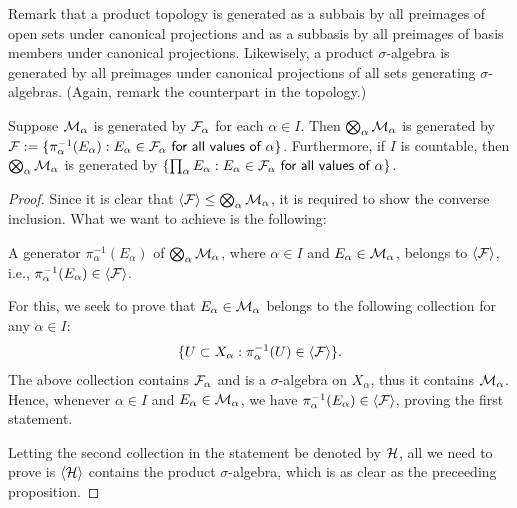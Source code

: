 Remark that a product topology is generated as a subbais by all preimages of open sets under canonical projections and as a subbasis by all preimages of basis members under canonical projections.
Likewisely, a product $\sigma$-algebra is generated by all preimages under canonical projections of all sets generating $\sigma$-algebras.
(Again, remark the counterpart in the topology.)
\begin{prop}
    Suppose ${\mathcal{M}}_\alpha$ is generated by ${\mathcal{F}}_\alpha$ for each $\alpha\in I$.
    Then $\bigotimes_\alpha{\mathcal{M}}_\alpha$ is generated by ${\mathcal{F}}:=\{\pi_\alpha^{-1}(E_\alpha):\textsf{$E_\alpha\in{\mathcal{F}}_\alpha$ for all values of $\alpha$}\}$.
    Furthermore, if $I$ is countable, then $\bigotimes_\alpha{\mathcal{M}}_\alpha$ is generated by $\{\prod_\alpha E_\alpha:\textsf{$E_\alpha\in{\mathcal{F}}_\alpha$ for all values of $\alpha$}\}$.
\end{prop}
\begin{proof}
    Since it is clear that ${\left\langle{{\mathcal{F}}}\right\rangle}\leq\bigotimes_\alpha{\mathcal{M}}_\alpha$, it is required to show the converse inclusion.
    What we want to achieve is the following:
    \begin{center}
        A generator $\pi_\alpha^{-1}(E_\alpha)$ of $\bigotimes_\alpha{\mathcal{M}}_\alpha$, where $\alpha\in I$ and $E_\alpha\in{\mathcal{M}}_\alpha$, belongs to ${\left\langle{{\mathcal{F}}}\right\rangle}$, i.e., $\pi_\alpha^{-1}(E_\alpha)\in{\left\langle{{\mathcal{F}}}\right\rangle}$.
    \end{center}
    For this, we seek to prove that $E_\alpha\in{\mathcal{M}}_\alpha$ belongs to the following collection for any $\alpha\in I$:
    \begin{align}\label{strategy for non-constructive objects}
        \{U\subset X_\alpha
        :
        \pi_\alpha^{-1}(U)\in{\left\langle{{\mathcal{F}}}\right\rangle}
        \}.
    \end{align}
    The above collection contains ${\mathcal{F}}_\alpha$ and is a $\sigma$-algebra on $X_\alpha$, thus it contains ${\mathcal{M}}_\alpha$.
    Hence, whenever $\alpha\in I$ and $E_\alpha\in{\mathcal{M}}_\alpha$, we have $\pi_\alpha^{-1}(E_\alpha)\in{\left\langle{{\mathcal{F}}}\right\rangle}$, proving the first statement.

    Letting the second collection in the statement be denoted by ${\mathcal{H}}$, all we need to prove is ${\left\langle{{\mathcal{H}}}\right\rangle}$ contains the product $\sigma$-algebra, which is as clear as the preceeding proposition.
\end{proof}
